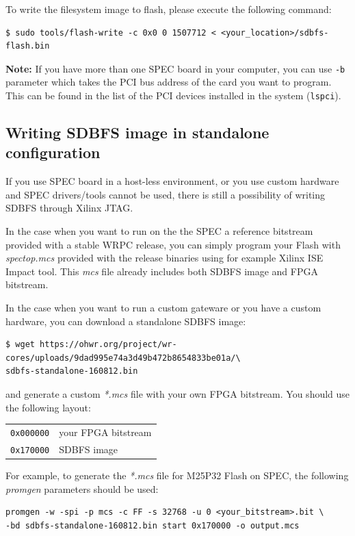 \documentclass[a4paper, 12pt]{article}
\renewcommand{\_}{\underscore\allowbreak}
\newcommand{\code}[1]{\texttt{#1}}
\begin{document}
To write the filesystem image to flash, please execute the following
command:
\begin{lstlisting}
$ sudo tools/flash-write -c 0x0 0 1507712 < <your_location>/sdbfs-flash.bin
\end{lstlisting}

\noindent\textbf{Note:} If you have more than one SPEC board in your computer,
you can use \code{-b} parameter which takes the PCI bus address of the card you
want to program. This can be found in the list of the PCI devices installed in
the system (\code{lspci}).

\subsection{Writing SDBFS image in standalone configuration}

If you use SPEC board in a host-less environment, or you use custom
hardware and SPEC drivers/tools cannot be used, there is still a
possibility of writing SDBFS through Xilinx JTAG.

\vspace{1em}
In the case when you want to run on the the SPEC a reference bitstream provided with a stable
WRPC release, you can simply program your Flash with \textit{spec\_top.mcs}
provided with the release binaries using for example Xilinx ISE Impact tool.
This \textit{mcs} file already includes both SDBFS image and FPGA bitstream.

In the case when you want to run a custom gateware or you have a custom hardware, you can
download a standalone SDBFS image:
\begin{lstlisting}
$ wget https://ohwr.org/project/wr-cores/uploads/9dad995e74a3d49b472b8654833be01a/\
sdbfs-standalone-160812.bin
\end{lstlisting}
and generate a custom \textit{*.mcs} file with your own FPGA bitstream. You should
use the following layout:
\begin{longtable}{  l  l }
\code{0x000000} & your FPGA bitstream \\
\code{0x170000} & SDBFS image\\
\end{longtable}

For example, to generate the \textit{*.mcs} file for M25P32 Flash on SPEC, the
following \textit{promgen} parameters should be used:
\begin{lstlisting}
promgen -w -spi -p mcs -c FF -s 32768 -u 0 <your_bitstream>.bit \
-bd sdbfs-standalone-160812.bin start 0x170000 -o output.mcs
\end{lstlisting}
\end{document}

